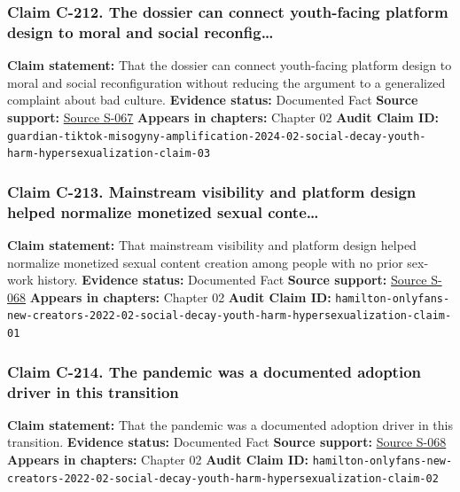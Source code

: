 \documentclass[
  american,
  11pt,
  letterpaper,
]{article}
\begin{document}
\subsubsection{Claim C-212. The dossier can connect youth-facing
platform design to moral and social
reconfig\ldots{}}\label{claim-c-212-the-dossier-can-connect-youth-facing-platform-design-to-moral-and-social-reconfig}

\textbf{Claim statement:} That the dossier can connect youth-facing
platform design to moral and social reconfiguration without reducing the
argument to a generalized complaint about bad culture. \textbf{Evidence
status:} Documented Fact \textbf{Source support:}
\hyperref[source-s-067-social-media-algorithms-amplifying-misogynistic-content]{Source
S-067} \textbf{Appears in chapters:} Chapter 02 \textbf{Audit Claim ID:}
\texttt{guardian-tiktok-misogyny-amplification-2024-02-social-decay-youth-harm-hypersexualization-claim-03}

\subsubsection{Claim C-213. Mainstream visibility and platform design
helped normalize monetized sexual
conte\ldots{}}\label{claim-c-213-mainstream-visibility-and-platform-design-helped-normalize-monetized-sexual-conte}

\textbf{Claim statement:} That mainstream visibility and platform design
helped normalize monetized sexual content creation among people with no
prior sex-work history. \textbf{Evidence status:} Documented Fact
\textbf{Source support:}
\hyperref[source-s-068-nudes-shouldn-t-i-charge-for-these-motivations-of-new-sexual-content-creators-on-onlyfans]{Source
S-068} \textbf{Appears in chapters:} Chapter 02 \textbf{Audit Claim ID:}
\texttt{hamilton-onlyfans-new-creators-2022-02-social-decay-youth-harm-hypersexualization-claim-01}

\subsubsection{Claim C-214. The pandemic was a documented adoption
driver in this
transition}\label{claim-c-214-the-pandemic-was-a-documented-adoption-driver-in-this-transition}

\textbf{Claim statement:} That the pandemic was a documented adoption
driver in this transition. \textbf{Evidence status:} Documented Fact
\textbf{Source support:}
\hyperref[source-s-068-nudes-shouldn-t-i-charge-for-these-motivations-of-new-sexual-content-creators-on-onlyfans]{Source
S-068} \textbf{Appears in chapters:} Chapter 02 \textbf{Audit Claim ID:}
\texttt{hamilton-onlyfans-new-creators-2022-02-social-decay-youth-harm-hypersexualization-claim-02}
\end{document}
